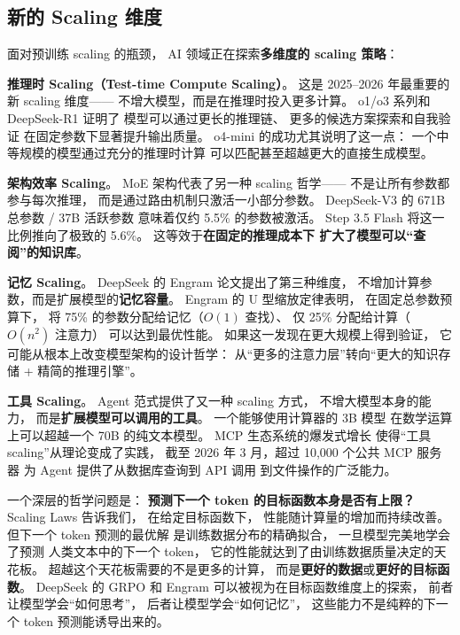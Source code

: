 \subsection{新的 Scaling 维度}

面对预训练 scaling 的瓶颈，
AI 领域正在探索\textbf{多维度的 scaling 策略}：

\textbf{推理时 Scaling（Test-time Compute Scaling）}。
这是 2025--2026 年最重要的新 scaling 维度——
不增大模型，而是在推理时投入更多计算。
o1/o3 系列和 DeepSeek-R1 证明了
模型可以通过更长的推理链、
更多的候选方案探索和自我验证
在固定参数下显著提升输出质量。
o4-mini 的成功尤其说明了这一点：
一个中等规模的模型通过充分的推理时计算
可以匹配甚至超越更大的直接生成模型。

\textbf{架构效率 Scaling}。
MoE 架构代表了另一种 scaling 哲学——
不是让所有参数都参与每次推理，
而是通过路由机制只激活一小部分参数。
DeepSeek-V3 的 671B 总参数 / 37B 活跃参数
意味着仅约 5.5\% 的参数被激活。
Step 3.5 Flash 将这一比例推向了极致的 5.6\%。
这等效于\textbf{在固定的推理成本下
扩大了模型可以“查阅”的知识库}。

\textbf{记忆 Scaling}。
DeepSeek 的 Engram 论文提出了第三种维度，
不增加计算参数，而是扩展模型的\textbf{记忆容量}。
Engram 的 U 型缩放定律表明，
在固定总参数预算下，
将 75\% 的参数分配给记忆（$O(1)$ 查找）、
仅 25\% 分配给计算（$O(n^2)$ 注意力）
可以达到最优性能。
如果这一发现在更大规模上得到验证，
它可能从根本上改变模型架构的设计哲学：
从“更多的注意力层”转向“更大的知识存储 + 精简的推理引擎”。

\textbf{工具 Scaling}。
Agent 范式提供了又一种 scaling 方式，
不增大模型本身的能力，
而是\textbf{扩展模型可以调用的工具}。
一个能够使用计算器的 3B 模型
在数学运算上可以超越一个 70B 的纯文本模型。
MCP 生态系统的爆发式增长
使得“工具 scaling”从理论变成了实践，
截至 2026 年 3 月，超过 10,000 个公共 MCP 服务器
为 Agent 提供了从数据库查询到 API 调用
到文件操作的广泛能力。

\begin{whybox}
一个深层的哲学问题是：
\textbf{预测下一个 token 的目标函数本身是否有上限？}
Scaling Laws 告诉我们，
在给定目标函数下，
性能随计算量的增加而持续改善。
但下一个 token 预测的最优解
是训练数据分布的精确拟合，
一旦模型完美地学会了预测
人类文本中的下一个 token，
它的性能就达到了由训练数据质量决定的天花板。
超越这个天花板需要的不是更多的计算，
而是\textbf{更好的数据}或\textbf{更好的目标函数}。
DeepSeek 的 GRPO 和 Engram
可以被视为在目标函数维度上的探索，
前者让模型学会“如何思考”，
后者让模型学会“如何记忆”，
这些能力不是纯粹的下一个 token 预测能诱导出来的。
\end{whybox}


